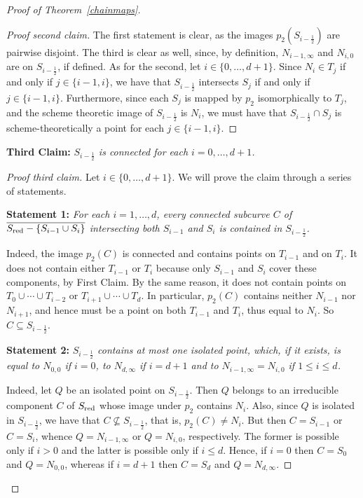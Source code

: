 \documentclass[10pt,a4paper]{amsart}
\def\red{\text{\rm red}}
\begin{document}
\begin{proof}[Proof of Theorem~\ref{chainmaps}]
\begin{proof}[Proof second claim] The first statement is clear, as the images $p_2(S_{i-\frac{1}{2}})$ are pairwise disjoint. The third is clear as well, since, by definition, $N_{i-1,\infty}$ and $N_{i,0}$ are on $S_{i-\frac{1}{2}}$, if defined. As for the second, let  $i\in\{0,\dots,d+1\}$. Since $N_i\in T_j$ if and only if $j\in\{i-1,i\}$, we have that $S_{i-\frac{1}{2}}$ intersects $S_j$ if and only if $j\in\{i-1,i\}$. Furthermore, since each $S_j$ is mapped by $p_2$ isomorphically to $T_j$, and the scheme theoretic image of $S_{i-\frac{1}{2}}$ is $N_i$, we must have that $S_{i-\frac{1}{2}}\cap S_j$ is scheme-theoretically a point for each $j\in\{i-1,i\}$.
\end{proof}

{\bf Third Claim:} {\it $S_{i-\frac{1}{2}}$ is connected for each $i=0,\dots,d+1$.}

\begin{proof}[Proof third claim] Let $i\in\{0,\dots,d+1\}$. We will prove the claim through a series of statements.

\vskip0.1cm

{\bf Statement 1:} {\it For each $i=1,\dots,d$, every connected subcurve $C$ of $\overline{S_\red-\{S_{i-1}\cup S_i\}}$ intersecting both $S_{i-1}$ and $S_i$ is contained in $S_{i-\frac{1}{2}}$.}

Indeed, the image $p_2(C)$ is connected and contains points on $T_{i-1}$ and on $T_i$. It does not contain either $T_{i-1}$ or $T_i$ because only $S_{i-1}$ and $S_i$ cover these components, by First Claim. By the same reason, it does not contain points on $T_0\cup\cdots\cup T_{i-2}$ or $T_{i+1}\cup\cdots\cup T_d$. In particular, $p_2(C)$ contains neither $N_{i-1}$ nor $N_{i+1}$, and hence must be a point on both $T_{i-1}$ and $T_i$, thus equal to $N_i$. So $C\subseteq S_{i-\frac{1}{2}}$. 

\vskip0.1cm

{\bf Statement 2:} {\it $S_{i-\frac{1}{2}}$ contains at most one isolated point, which, if it exists, is equal to $N_{0,0}$ if $i=0$, to $N_{d,\infty}$ if $i=d+1$ and to $N_{i-1,\infty}= N_{i,0}$ if $1\leq i\leq d$.}

Indeed, let $Q$ be an isolated point on $S_{i-\frac{1}{2}}$. Then $Q$ belongs to an irreducible component $C$ of $S_\red$ whose image under $p_2$ contains $N_i$. Also, since $Q$ is isolated in $S_{i-\frac{1}{2}}$, we have that $C\not\subseteq S_{i-\frac{1}{2}}$, that is, $p_2(C)\neq N_i$. But then $C=S_{i-1}$ or $C=S_i$, whence $Q=N_{i-1,\infty}$ or $Q=N_{i,0}$, respectively. The former is possible only if $i>0$ and the latter is possible only if $i\leq d$. Hence, if $i=0$ then $C=S_0$ and $Q=N_{0,0}$, whereas if $i=d+1$ then $C=S_d$ and $Q=N_{d,\infty}$.


\end{proof}
\end{proof}
\end{document}
